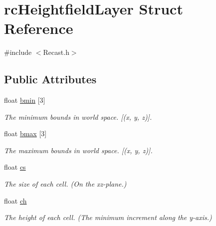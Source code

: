 \hypertarget{structrcHeightfieldLayer}{}\section{rc\+Heightfield\+Layer Struct Reference}
\label{structrcHeightfieldLayer}


{\ttfamily \#include $<$Recast.\+h$>$}

\subsection*{Public Attributes}
\begin{DoxyCompactItemize}
\item 
\mbox{\label{structrcHeightfieldLayer_ab38f0082004f3ac1ffa73846b085150b}} 
float \hyperlink{structrcHeightfieldLayer_ab38f0082004f3ac1ffa73846b085150b}{bmin} \mbox{[}3\mbox{]}
\begin{DoxyCompactList}\small\item\em The minimum bounds in world space. \mbox{[}(x, y, z)\mbox{]}. \end{DoxyCompactList}\item 
\mbox{\label{structrcHeightfieldLayer_a7fe81bf3df3d9e98be908e812571e63e}} 
float \hyperlink{structrcHeightfieldLayer_a7fe81bf3df3d9e98be908e812571e63e}{bmax} \mbox{[}3\mbox{]}
\begin{DoxyCompactList}\small\item\em The maximum bounds in world space. \mbox{[}(x, y, z)\mbox{]}. \end{DoxyCompactList}\item 
\mbox{\label{structrcHeightfieldLayer_af0311febcc96aa2a2b611e0a65478f49}} 
float \hyperlink{structrcHeightfieldLayer_af0311febcc96aa2a2b611e0a65478f49}{cs}
\begin{DoxyCompactList}\small\item\em The size of each cell. (On the xz-\/plane.) \end{DoxyCompactList}\item 
\mbox{\label{structrcHeightfieldLayer_a4e3df2893e1773e801e6f41d077715d6}} 
float \hyperlink{structrcHeightfieldLayer_a4e3df2893e1773e801e6f41d077715d6}{ch}
\begin{DoxyCompactList}\small\item\em The height of each cell. (The minimum increment along the y-\/axis.) \end{DoxyCompactList}\item 

\end{DoxyCompactItemize}
